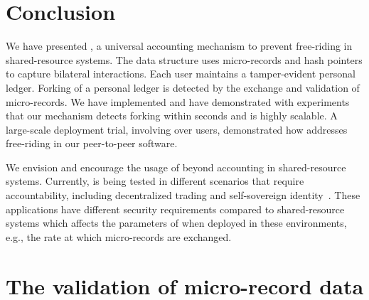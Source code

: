 
\section{Conclusion}
We have presented \ModelName{}, a universal accounting mechanism to prevent free-riding in shared-resource systems.
The \ModelName{} data structure uses micro-records and hash pointers to capture bilateral interactions.
Each user maintains a tamper-evident personal ledger.
Forking of a personal ledger is detected by the exchange and validation of micro-records.
We have implemented \ModelName{} and have demonstrated with experiments that our mechanism detects forking within seconds and is highly scalable.
A large-scale deployment trial, involving over \TrialUsers{} users, demonstrated how \ModelName{} addresses free-riding in our peer-to-peer software.

We envision and encourage the usage of \ModelName{} beyond accounting in shared-resource systems.
Currently, \ModelName{} is being tested in different scenarios that require accountability, including decentralized trading and self-sovereign identity~\cite{de2020xchange,stokkink2018deployment}.
These applications have different security requirements compared to shared-resource systems which affects the parameters of \ModelName{} when deployed in these environments, e.g., the rate at which micro-records are exchanged.

%
%

\newpage

\appendix

\section{The validation of micro-record data}
\label{sec:validation_record_data}

